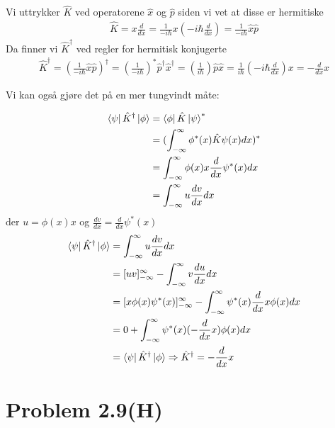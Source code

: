 \documentclass[norsk,a4paper,12pt]{article}
\begin{document}
		Vi uttrykker $\hat{K}$ ved operatorene $\hat{x}$ og $\hat{p}$ siden vi vet at disse er hermitiske
		\begin{equation}
		\begin{aligned}
		\hat{K} = x\frac{d}{dx} = \frac{1}{-i\hbar}x (-i\hbar\frac{d}{dx}) = \frac{1}{-i\hbar}\hat{x}\hat{p}
		\end{aligned}
		\end{equation}
		Da finner vi $\hat{K}^\dagger$ ved regler for hermitisk konjugerte
		\begin{equation}
		\begin{aligned}
		\hat{K}^\dagger = (\frac{1}{-i\hbar}\hat{x}\hat{p})^\dagger = (\frac{1}{-i\hbar})^*\hat{p}^\dagger\hat{x}^\dagger
		= (\frac{1}{i\hbar})\hat{p}\hat{x} = \frac{1}{i\hbar}(-i\hbar\frac{d}{dx})x 
		= -\frac{d}{dx}x
		\end{aligned}
		\end{equation}
		
		Vi kan også gjøre det på en mer tungvindt måte:
		
		\begin{equation}
		\begin{aligned}
		\bra{\psi}\hat{K}^\dagger\ket{\phi} &= \bra{\phi}\hat{K}\ket{\psi}^* \\
		&= (\int_{-\infty}^{\infty}\phi^*(x)\hat{K}\psi(x)dx)^* \\
		&= \int_{-\infty}^{\infty}\phi(x)x\frac{d}{dx}\psi^*(x)dx \\
		&= \int_{-\infty}^{\infty}u\frac{dv}{dx}dx
		\end{aligned}
		\end{equation}
		der $u = \phi(x)x$ og $\frac{dv}{dx} = \frac{d}{dx}\psi^*(x)$
		\begin{equation}
		\begin{aligned}
		\bra{\psi}\hat{K}^\dagger\ket{\phi} &= \int_{-\infty}^{\infty}u\frac{dv}{dx}dx \\
		&= [uv]_{-\infty}^{\infty} - \int_{-\infty}^{\infty}v\frac{du}{dx}dx \\
		&= [x\phi(x)\psi^*(x)]_{-\infty}^{\infty} - \int_{-\infty}^{\infty}\psi^*(x)\frac{d}{dx}x\phi(x)dx \\
		&= 0 + \int_{-\infty}^{\infty}\psi^*(x)(-\frac{d}{dx}x)\phi(x)dx \\
		&= \bra{\psi}\hat{K}^\dagger\ket{\phi} \Rightarrow \hat{K}^\dagger = -\frac{d}{dx}x
		\end{aligned}
		\end{equation}
	\section*{Problem 2.9(H)}
		
\end{document}
